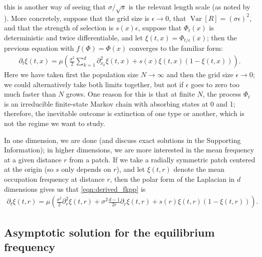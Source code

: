 \documentclass{article}
\newcommand{\citet}[1]{\cite{#1}}
\DeclareMathOperator{\var}{Var}
\begin{document}
this is another way of seeing that $\sigma/\sqrt{s}$ is the relevant length scale (as noted by \citet{slatkin1973geneflow}).
More concretely, suppose that the grid size is $\epsilon \to 0$, 
that $\var[R] = (\sigma \epsilon)^2$, and that the strength of selection is $s(x) \epsilon$,
suppose that $\Phi_t(x)$ is deterministic and twice differentiable,
and let $\xi(t,x) = \Phi_{t/\epsilon}(x)$;
then the previous equation with $f(\Phi) = \Phi(x)$ converges to the familiar form:
\begin{align}
  \label{eqn:derived_fkpp}
  \partial_t \xi(t,x) = \mu \left( \frac{\sigma^2}{2} \sum_{k=1}^d \partial_{x_k}^2 \xi(t,x) + s(x) \xi(t,x) (1-\xi(t,x)) \right) .
\end{align}
Here we have taken first the population size $N \to \infty$ and then the grid size $\epsilon \to 0$;
we could alternatively take both limits together, but not if $\epsilon$ goes to zero too much faster than $N$ grows.
One reason for this is that at finite $N$,
the process $\Phi_t$ is an irreducible finite-state Markov chain with absorbing states at 0 and 1;
therefore, the inevitable outcome is extinction of one type or another,
which is not the regime we want to study.

In one dimension, we are done (and discuss exact solutions in the Supporting Information);
in higher dimensions, we are more interested in the mean frequency at a given distance $r$ from a patch.
If we take a radially symmetric patch centered at the origin (so $s$ only depends on $r$), 
and let $\xi(t,r)$ denote the mean occupation frequency at distance $r$,
then the polar form of the Laplacian in $d$ dimensions gives us that \eqref{eqn:derived_fkpp} is
\begin{align}
  \label{eqn:radial_fkpp}
  \partial_t \xi(t,r) = \mu \left( \frac{\sigma^2}{2} \partial_{r}^2 \xi(t,r) + \sigma^2\frac{d-1}{2r} \partial_r \xi(t,r) + s(r) \xi(t,r) (1-\xi(t,r)) \right) .
\end{align}


\subsection[Asymptotics]{Asymptotic solution for the equilibrium frequency} 
\label{apx:asymptotics}
\end{document}
